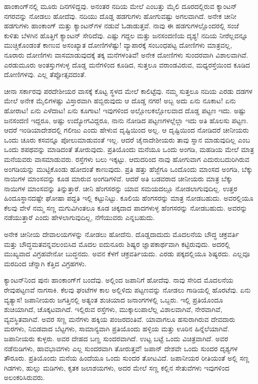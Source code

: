 ಹಾಂಕಾಂಗ್‌ನಲ್ಲಿ ಮೂರು ದಿನಗಳಿದ್ದವು. ಅನಂತರ ನದಿಯ ಮೇಲೆ ಎಂಬತ್ತು ಮೈಲಿ ದೂರದಲ್ಲಿರುವ ಕ್ಯಾಂಟನ್ ನಗರವನ್ನು ನೋಡಲು ಹೋದೆವು. ನದಿಯು ದೊಡ್ಡ ಹಡಗುಗಳು ಹೋಗುವಷ್ಟು ಅಗಲವಾಗಿದೆ. ಅನೇಕ ಚೀನೀ ಹಡಗುಗಳು ಹಾಂಕಾಂಗ್ ಮತ್ತು ಕ್ಯಾಂಟನ್‌ಗಳ ನಡುವೆ ಓಡಾಡುತ್ತವೆ. ನಾವು ಈ ಹಡಗುಗಳಲ್ಲೊಂದರಲ್ಲಿ ಸಂಜೆ ಕುಳಿತು ಬೆಳಗಿನ ಹೊತ್ತಿಗೆ ಕ್ಯಾಂಟನ್‌ ಸೇರಿದೆವು. ಎಷ್ಟು ಗದ್ದಲ ಮತ್ತು ಜನಸಂದಣಿಯ ದೃಶ್ಯ! ನದಿಯ ನೀರೆಲ್ಲವನ್ನೂ ಮುಚ್ಚಿಕೊಂಡಂತೆ ಕಾಣುವ ಅಸಂಖ್ಯಾತ ದೋಣಿಗಳೆಷ್ಟು! ವ್ಯಾಪಾರಕ್ಕೆ ಸಂಬಂಧಪಟ್ಟ ದೋಣಿಗಳು ಮಾತ್ರವಲ್ಲ, ನೂರಾರು ದೋಣಿಗಳು ವಾಸಮಾಡುವುದಕ್ಕೆ ತಕ್ಕ ಮನೆಗಳಂತಿವೆ! ಅನೇಕ ದೋಣಿಗಳು ಸುಂದರವಾಗಿ ವಿಶಾಲವಾಗಿವೆ. ಎರಡು\enginline{-}ಮೂರು ಅಂತಸ್ತುಗಳುಳ್ಳ ದೊಡ್ಡ ಮನೆಗಳಿಂದ ಕೂಡಿದ, ಸುತ್ತಲೂ ವರಾಂಡವಿರುವ, ಮಧ್ಯರಸ್ತೆಯಿಂದ ಕೂಡಿದ ದೋಣಿಗಳವು. ಎಲ್ಲ ತೆಪ್ಪೋತ್ಸವದಂತೆ.

ಚೀನಾ ಸರ್ಕಾರವು ಪರದೇಶೀಯರ ವಾಸಕ್ಕೆ ಕೊಟ್ಟ ಸ್ಥಳದ ಮೇಲೆ ಕಾಲಿಟ್ಟೆವು. ನಮ್ಮ ಸುತ್ತಲೂ ನದಿಯ ಎರಡು ದಡಗಳ ಮೇಲೆ ಅನೇಕ ಮೈಲಿಗಳಷ್ಟು ವಿಸ್ತಾರವಾಗಿ ಹಬ್ಬಿರುವುದು ಆ ದೊಡ್ಡ ನಗರ! ಅಬ್ಬ ಅದು ಏನು ನೂಕಾಟ! ಏನು ಹೋರಾಟ! ಏನು ಎಳೆದಾಟ! ಏನು ಕೂಗಾಟ! ಇವುಗಳಿಂದ ಅಲ್ಲೋಲಕಲ್ಲೋಲವಾದ ದೊಡ್ಡ ಪಟ್ಟಣ ಇದು. ಅಷ್ಟು ಜನಸಂದಣಿ ಇದ್ದರೂ, ಅಷ್ಟು ಉದ್ಯೋಗವಿದ್ದರೂ, ನಾನು ನೋಡಿದ ಪಟ್ಟಣಗಳಲ್ಲೆಲ್ಲಾ ಇದು ಅತಿ ಹೊಲಸು ಪಟ್ಟಣ. ಆದರೆ ಇಂಡಿಯಾದೇಶದಲ್ಲಿ ಗಲೀಜು ಎಂದು ಹೇಳುವ ದೃಷ್ಟಿಯಿಂದ ಅಲ್ಲ. ಆ ದೃಷ್ಟಿಯಿಂದ ನೋಡಿದರೆ ಚೀನೀಯರು ಒಂದು ಚೂರು ಕಸವನ್ನೂ ಪೋಲುಮಾಡುವಂತೆ ಇಲ್ಲ. ಆದರೆ ಚೈನಾದೇಶೀಯರು ತಾವು ಸ್ನಾನ ಮಾಡುವುದಿಲ್ಲ ಎಂಬ ಒಂದು ಶಪಥವನ್ನು ಮಾಡಿದಂತೆ ತೋರುವುದು. ಪ್ರತಿಯೊಂದು ಮನೆಯೂ ಒಂದು ಅಂಗಡಿ, ಮಹಡಿಯ ಮೇಲೆ ಮಾತ್ರ ಮನೆಯವರು ವಾಸಮಾಡುವರು. ರಸ್ತೆಗಳು ಬಲು ಇಕ್ಕಟ್ಟು. ಆದುದರಿಂದ ನಾವು ಹೋಗುವಾಗ ಎದುರುಬದುರಿಗಿರುವ ಅಂಗಡಿಯನ್ನು ಮುಟ್ಟಿಕೊಂಡು ಹೋದಂತೆ ಕಾಣುವುದು. ಪ್ರತಿ ಹತ್ತು ಹೆಜ್ಜೆಗೂ ಒಂದೊಂದು ಮಾಂಸದ ಅಂಗಡಿ, ಬೆಕ್ಕು ನಾಯಿಗಳ ಮಾಂಸವನ್ನು ಕೂಡ ಮಾರುವ ಅಂಗಡಿಗಳಿವೆ. ಆದರೆ ಅತಿ ಬಡವರಾದ ಚೀನೀಯರು ಮಾತ್ರ ಬೆಕ್ಕು ನಾಯಿಗಳ ಮಾಂಸವನ್ನು ತಿನ್ನುತ್ತಾರೆ. ಚೀನಿ ಹೆಂಗಸರನ್ನು ಯಾವ ಸಮಯದಲ್ಲೂ ನೋಡಲಾಗುವುದಿಲ್ಲ. ಉತ್ತರ ಹಿಂದೂಸ್ಥಾನದಷ್ಟೇ ಘೋಷಾ ಪದ್ದತಿ ಇಲ್ಲಿ ಕಟ್ಟುನಿಟ್ಟು. ಕೂಲಿಯ ಹೆಂಗಸರನ್ನು ಮಾತ್ರ ನೋಡಬಹುದು. ಅವರಲ್ಲಿಯೂ ಕೆಲವು ವೇಳೆ ನಮ್ಮ ಸಣ್ಣ ಮಗುವಿಗಿಂತಲೂ ಕೂಡ ಚಿಕ್ಕದಾದ ಪಾದಗಳುಳ್ಳ ಹೆಂಗಸರನ್ನು ನೋಡಬಹುದು. ಅವರನ್ನು ನಡೆಯುತ್ತಾರೆ ಎಂದು ಹೇಳಲಾಗುವುದಿಲ್ಲ, ನೆಗೆಯುವರು ಎನ್ನಬಹುದು.

ಅನೇಕ ಚೀನೀಯ ದೇವಾಲಯಗಳನ್ನು ನೋಡಲು ಹೋದೆನು. ದೊಡ್ಡದಾದುದು ಮೊದಲನೆಯ ಬೌದ್ಧ ಚಕ್ರವರ್ತಿ ಮತ್ತು ಬೌದ್ಧಮತವನ್ನವಲಂಬಿಸಿದ ಮೊದಲ ಐದುನೂರು ಶಿಷ್ಯರ ಜ್ಞಾಪಕಾರ್ಥವಾಗಿ ಕಟ್ಟಿರುವುದು. ಅದರಲ್ಲಿ ಮುಖ್ಯವಾದ ವಿಗ್ರಹವೇನೋ ಬುದ್ಧನದು. ಅವನ ಕೆಳಗೆ ಚಕ್ರವರ್ತಿಯದು. ಎರಡು ಪಕ್ಕದಲ್ಲಿಯೂ ಶಿಷ್ಯರದು. ಎಲ್ಲವೂ ಮರದಿಂದ ಚೆನ್ನಾಗಿ ಕೆತ್ತಿದ ವಿಗ್ರಹಗಳು.

ಕ್ಯಾಂಟನ್‌ನಿಂದ ಪುನಃ ಹಾಂಕಾಂಗ್‌ಗೆ ಬಂದೆವು. ಅಲ್ಲಿಂದ ಜಪಾನಿಗೆ ಹೋದೆವು. ನಾವು ಸೇರಿದ ಮೊದಲನೆಯ ರೇವುಪಟ್ಟಣವೆ ನಾಗಸಾಕಿ. ಕೆಲವು ಘಂಟೆಗಳ ಕಾಲ ಅಲ್ಲಿಳಿದು ಪಟ್ಟಣವನ್ನು ನೋಡಲು ಗಾಡಿಯಲ್ಲಿ ಹೊರಟೆವು. ಏನು ವ್ಯತ್ಯಾಸ! ಜಪಾನೀಯರು ಜಗತ್ತಿನಲ್ಲಿ ಅತ್ಯಂತ ಶುಚಿಯಾದ ಜನಾಂಗಗಳಲ್ಲಿ ಒಬ್ಬರು. ಇಲ್ಲಿ ಪ್ರತಿಯೊಂದೂ ಶುಚಿಯಾಗಿದೆ, ಚೊಕ್ಕಟವಾಗಿದೆ. ಇಲ್ಲಿರುವ ರಸ್ತೆಗಳು, ಮುಕ್ಕಾಲುಪಾಲೆಲ್ಲ ವಿಶಾಲವಾಗಿವೆ, ನೇರವಾಗಿವೆ, ವ್ಯವಸ್ಥಿತವಾಗಿವೆ. ಅವರ ಸಣ್ಣ ಮನೆಗಳು ಹಕ್ಕಿಯ ಪಂಜರದಂತಿವೆ. ಯಾವಾಗಲೂ ಹಸುರಾಗಿರುವ ದೇವದಾರು ಮರಗಳು, ನಿಬಿಡವಾದ ಬೆಟ್ಟಗಳು, ಸಾಮಾನ್ಯವಾಗಿ ಪ್ರತಿಯೊಂದು ಹಳ್ಳಿಯ ಮತ್ತು ಊರಿನ ಹಿನ್ನೆಲೆಯಾಗಿವೆ. ಜಪಾನೀಯರು ಕುಳ್ಳರು. ಅವರ ದೇಹದ ಬಣ್ಣ ಸುಂದರವಾಗಿದೆ. ಉಟ್ಟ ಬಟ್ಟೆ ಒಂದು ವಿಚಿತ್ರವಾಗಿದೆ. ಅವರ ನಡೆನುಡಿಗಳು, ಹಾವಭಾವಗಳು ಎಲ್ಲ ಸುಂದರವಾಗಿ ತೋರುತ್ತವೆ! ಜಪಾನ್ ದೇಶವೇ ಒಂದು ಸುಂದರ ದೃಶ್ಯಗಳ ತೌರೂರು. ಪ್ರತಿಯೊಂದು ಮನೆಯ ಹಿಂದೆಯೂ ಒಂದು ಸುಂದರ ತೋಟವಿದೆ. ಜಪಾನೀಯರ ರೀತಿಯಂತೆ ಅಲ್ಲಿ ಸಣ್ಣ ಗಿಡಗಳು, ಹುಲ್ಲು ಮಡಿಗಳು, ಕೃತಕ ಜಲಾಶಯಗಳು, ಅದರ ಮೇಲೆ ಸಣ್ಣ ಕಲ್ಲಿನ ಸೇತುವೆಗಳು ಇವುಗಳಿಂದ ಅಲಂಕರಿಸಿರುವರು.

